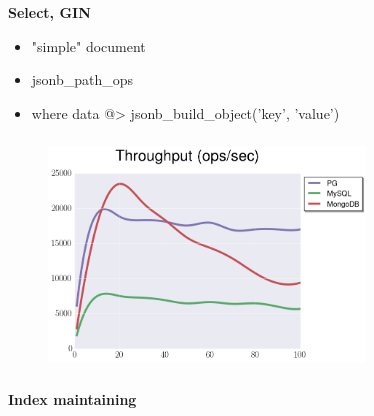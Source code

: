 \documentclass[usenames,dvipsnames, 18pt, compress, aspectratio=169]{beamer}
\begin{document}
\begin{frame}
    \frametitle{}
    \begin{center}
        \textbf{Select, GIN}
        \begin{itemize}[label={}]
            \item "simple" document
            \item jsonb\_path\_ops
            \item where data @> jsonb\_build\_object('key', 'value')
        \end{itemize}
    \end{center}
\end{frame}

\begin{frame}
    \frametitle{}
    \begin{center}
    \begin{figure}
        \includegraphics[width=0.75\textwidth,center]{benchmarks/select_jsonb_path_ops_no_parse_throughput.png}
    \end{figure}
    \end{center}
\end{frame}



\begin{frame}
    \frametitle{}
    \begin{center}
        \textbf{Index maintaining}
    \end{center}
\end{frame}
\end{document}
